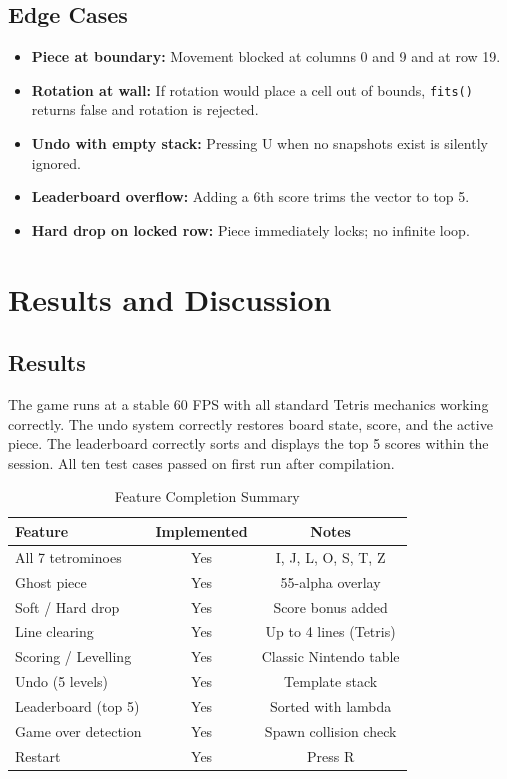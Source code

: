 \documentclass[11pt]{article}
\begin{document}
\subsection{Edge Cases}
\begin{itemize}
    \item \textbf{Piece at boundary:} Movement blocked at columns 0 and 9 and at row 19.
    \item \textbf{Rotation at wall:} If rotation would place a cell out of bounds, \texttt{fits()} returns false and rotation is rejected.
    \item \textbf{Undo with empty stack:} Pressing U when no snapshots exist is silently ignored.
    \item \textbf{Leaderboard overflow:} Adding a 6th score trims the vector to top 5.
    \item \textbf{Hard drop on locked row:} Piece immediately locks; no infinite loop.
\end{itemize}

\section{Results and Discussion}

\subsection{Results}
The game runs at a stable 60 FPS with all standard Tetris mechanics working correctly.
The undo system correctly restores board state, score, and the active piece.
The leaderboard correctly sorts and displays the top 5 scores within the session.
All ten test cases passed on first run after compilation.

\begin{table}[H]
    \centering
    \caption{Feature Completion Summary}
    \label{tab:perf}
    \begin{tabular}{lcc}
        \toprule
        \textbf{Feature} & \textbf{Implemented} & \textbf{Notes} \\
        \midrule
        All 7 tetrominoes    & Yes & I, J, L, O, S, T, Z \\
        Ghost piece          & Yes & 55-alpha overlay \\
        Soft / Hard drop     & Yes & Score bonus added \\
        Line clearing        & Yes & Up to 4 lines (Tetris) \\
        Scoring / Levelling  & Yes & Classic Nintendo table \\
        Undo (5 levels)      & Yes & Template stack \\
        Leaderboard (top 5)  & Yes & Sorted with lambda \\
        Game over detection  & Yes & Spawn collision check \\
        Restart              & Yes & Press R \\
        \bottomrule
    \end{tabular}
\end{table}
\end{document}
